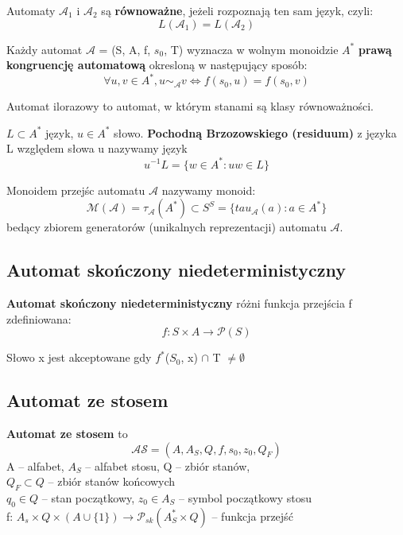 \documentclass[main.tex]{subfiles}
\begin{document}
    \begin{definition}
        Automaty $\mathcal{A}_{1}$ i  $\mathcal{A}_{2}$ są \textbf{równoważne}, jeżeli rozpoznają ten sam język, czyli:
        \[L(\mathcal{A}_{1}) = L(\mathcal{A}_{2})\]
    \end{definition}

    \begin{definition}
        Każdy automat $\mathcal{A}$ = (S, A, f, $s_{0}$, T) wyznacza w wolnym monoidzie $A^{*}$ \textbf{prawą kongruencję
        automatową} okresloną w następujący sposób:
        \[\forall u,v \in A^{*}, u \sim_\mathcal{A} v \Leftrightarrow f(s_{0}, u) = f(s_{0}, v)\]

        Automat ilorazowy to automat, w którym stanami są klasy równoważności.
    \end{definition}

    \begin{definition}
        $L \subset  A^{*}$ język, $u \in A^{*}$ słowo.
        \textbf{Pochodną Brzozowskiego (residuum)} z języka L względem słowa u nazywamy język
        \[u^{-1}L = \{w \in A^{*}  : uw \in L \}\]
    \end{definition}

    \begin{definition}
        Monoidem przejśc automatu $\mathcal{A}$ nazywamy monoid:
        \[\mathcal{M(A)} = \tau_\mathcal{A}(A^*) \subset S^{S} = \{tau_\mathcal{A}(a) : a \in A^*\}\]
        bedący zbiorem generatorów (unikalnych reprezentacji) automatu $\mathcal{A}$.
    \end{definition}

    \subsection{Automat skończony niedeterministyczny}
    \begin{definition}
        \textbf{Automat skończony niedeterministyczny} różni funkcja przejścia f zdefiniowana:
        \[f : S \times A \rightarrow \mathcal{P} (S) \]

        Słowo x jest akceptowane gdy $f^{*}$($S_{0}$, x) $\cap$ T $\neq \emptyset$
    \end{definition}

    \subsection{Automat ze stosem}
    \begin{definition}
        \textbf{Automat ze stosem} to
        \[\mathcal{AS} = (A, A_{S}, Q, f, s_{0}, z_{0}, Q_{F})\]
        A -- alfabet, $A_{S}$ -- alfabet stosu, Q -- zbiór stanów,\\
        $Q_{F} \subset Q$ -- zbiór stanów końcowych\\
        $q_{0} \in Q$ -- stan początkowy, $z_{0} \in A_{S}$ -- symbol początkowy stosu\\
        f: $A_{s} \times Q \times (A \cup \{1\}) \rightarrow \mathcal{P}_{sk}(A^{*}_{S} \times Q)$ -- funkcja przejść
    \end{definition}
\end{document}
